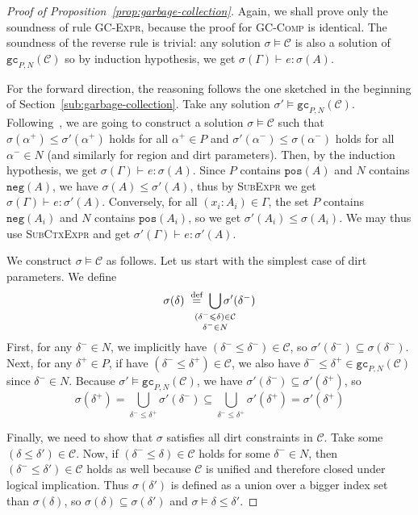 \documentclass{LMCS}
\newcommand{\defeq}{\mathrel{\;\stackrel{\text{def}}{=}\;}}
\newcommand{\rulename}[1]{{\mdseries \small \textsc{#1}}}
\newcommand{\drt}{\delta}
\newcommand{\kord}[1]{\mathtt{#1}}
\newcommand{\ctx}{\Gamma}
\newcommand{\ent}[1][]{\vdash_{#1}}
\newcommand{\T}{\mathrel{:}}
\renewcommand{\le}{\leqslant}
\newcommand{\cstr}{\mathcal{C}}
\newcommand{\sol}{\sigma}
\newcommand{\pos}{\kord{pos}}
\renewcommand{\neg}{\kord{neg}}
\newcommand{\gc}[1][P, N]{\kord{gc}_{#1}}
\begin{document}
\begin{proof}[Proof of Proposition~\ref{prop:garbage-collection}]
Again, we shall prove only the soundness of rule \rulename{GC-Expr}, because the proof for \rulename{GC-Comp} is identical.
The soundness of the reverse rule is trivial:
any solution $\sol \models \cstr$ is also a solution of $\gc(\cstr)$ so by induction hypothesis, we get $\sol(\ctx) \ent e \T \sol(A)$.

For the forward direction, the reasoning follows the one sketched in the beginning of Section~\ref{sub:garbage-collection}.
Take any solution $\sol' \models \gc(\cstr)$.
Following~\cite{simonet2003type},
we are going to construct a solution $\sol \models \cstr$
such that $\sol(\alpha^+) \le \sol'(\alpha^+)$ holds for all $\alpha^+ \in P$
and $\sol'(\alpha^-) \le \sol(\alpha^-)$ holds for all $\alpha^- \in N$
(and similarly for region and dirt parameters).
Then, by the induction hypothesis, we get $\sol(\ctx) \ent e \T \sol(A)$.
Since $P$ contains $\pos(A)$ and $N$ contains $\neg(A)$, we have $\sol(A) \le \sol'(A)$,
thus by \rulename{SubExpr} we get $\sol(\ctx) \ent e \T \sol'(A)$.
Conversely, for all $(x_i \T A_i) \in \ctx$, the set $P$ contains $\neg(A_i)$ and $N$ contains $\pos(A_i)$,
so we get $\sol'(A_i) \le \sol(A_i)$.
We may thus use \rulename{SubCtxExpr} and get $\sol'(\ctx) \ent e \T \sol'(A)$.

We construct $\sol \models \cstr$ as follows.
Let us start with the simplest case of dirt parameters.
We define
\newcommand{\mini}[2][3]{\hspace{-#1em}#2\hspace{-#1em}}
\newcommand{\ministack}[2][3]{\mini[#1]{\substack{#2}}}
\[
  \sol(\drt) \defeq \bigcup_{\ministack{(\drt^- \le \drt) \in \cstr \\ \drt^- \in N}} \sol'(\drt^-)
\]
First, for any $\drt^- \in N$,
we implicitly have $(\drt^- \le \drt^-) \in \cstr$,
so $\sol'(\drt^-) \subseteq \sol(\drt^-)$.
Next, for any $\drt^+ \in P$, if have $(\drt^- \le \drt^+) \in \cstr$,
we also have $\drt^- \le \drt^+ \in \gc(\cstr)$ since $\drt^- \in N$.
Because $\sol' \models \gc(\cstr)$, we have $\sol'(\drt^-) \subseteq \sol'(\drt^+)$,
so
\[
  \sol(\drt^+) = \bigcup_{\drt^- \le \drt^+} \sol'(\drt^-) \subseteq \bigcup_{\drt^- \le \drt^+} \sol'(\drt^+) = \sol'(\drt^+)
\]

Finally, we need to show that $\sol$ satisfies all dirt constraints in $\cstr$.
Take some $(\drt \le \drt') \in \cstr$.
Now, if $(\drt^- \le \drt) \in \cstr$ holds for some $\drt^- \in N$,
then $(\drt^- \le \drt') \in \cstr$ holds as well
because $\cstr$ is unified and therefore closed under logical implication.
Thus $\sol(\drt')$ is defined as a union over a bigger index set than $\sol(\drt)$,
so $\sol(\drt) \subseteq \sol(\drt')$ and $\sol \models \drt \le \drt'$.


\end{proof}
\end{document}

